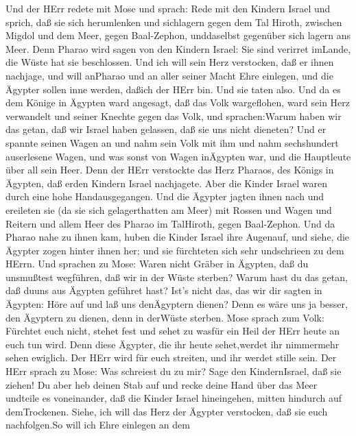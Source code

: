  Und der HErr redete mit Mose und sprach:  Rede
mit den Kindern Israel und sprich, daß sie sich herumlenken und
sichlagern gegen dem Tal Hiroth, zwischen Migdol und dem Meer, gegen
Baal-Zephon, unddaselbst gegenüber sich lagern ans Meer. 
Denn Pharao wird sagen von den Kindern Israel: Sie sind verirret
imLande, die Wüste hat sie beschlossen.  Und ich will sein
Herz verstocken, daß er ihnen nachjage, und will anPharao und an aller
seiner Macht Ehre einlegen, und die Ägypter sollen inne werden, daßich
der HErr bin. Und sie taten also.  Und da es dem Könige in
Ägypten ward angesagt, daß das Volk wargeflohen, ward sein Herz
verwandelt und seiner Knechte gegen das Volk, und sprachen:Warum haben
wir das getan, daß wir Israel haben gelassen, daß sie uns nicht
dieneten?  Und er spannte seinen Wagen an und nahm sein Volk
mit ihm  und nahm sechshundert auserlesene Wagen, und was
sonst von Wagen inÄgypten war, und die Hauptleute über all sein Heer.
 Denn der HErr verstockte das Herz Pharaos, des Königs in
Ägypten, daß erden Kindern Israel nachjagete. Aber die Kinder Israel
waren durch eine hohe Handausgegangen.  Und die Ägypter
jagten ihnen nach und ereileten sie (da sie sich gelagerthatten am Meer)
mit Rossen und Wagen und Reitern und allem Heer des Pharao im TalHiroth,
gegen Baal-Zephon.  Und da Pharao nahe zu ihnen kam, huben
die Kinder Israel ihre Augenauf, und siehe, die Ägypter zogen hinter
ihnen her; und sie fürchteten sich sehr undschrieen zu dem HErrn.
 Und sprachen zu Mose: Waren nicht Gräber in Ägypten, daß
du unsmußtest wegführen, daß wir in der Wüste sterben? Warum hast du das
getan, daß duuns aus Ägypten geführet hast?  Ist's nicht
das, das wir dir sagten in Ägypten: Höre auf und laß uns denÄgyptern
dienen? Denn es wäre uns ja besser, den Ägyptern zu dienen, denn in
derWüste sterben.  Mose sprach zum Volk: Fürchtet euch
nicht, stehet fest und sehet zu wasfür ein Heil der HErr heute an euch
tun wird. Denn diese Ägypter, die ihr heute sehet,werdet ihr nimmermehr
sehen ewiglich.  Der HErr wird für euch streiten, und ihr
werdet stille sein.  Der HErr sprach zu Mose: Was schreiest
du zu mir? Sage den KindernIsrael, daß sie ziehen!  Du aber
heb deinen Stab auf und recke deine Hand über das Meer undteile es
voneinander, daß die Kinder Israel hineingehen, mitten hindurch auf
demTrockenen.  Siehe, ich will das Herz der Ägypter
verstocken, daß sie euch nachfolgen.So will ich Ehre einlegen an dem
